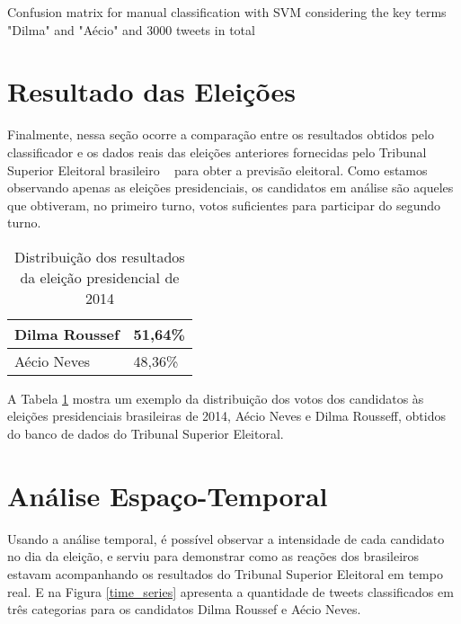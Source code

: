  Confusion matrix for manual classification with SVM considering the
 key terms "Dilma" and "Aécio" and 3000 tweets in total
 
 
 
 \section{Resultado das Eleições}
 
 Finalmente, nessa seção ocorre a comparação
 entre os resultados obtidos pelo classificador e os dados
 reais das eleições anteriores fornecidas pelo Tribunal Superior
 Eleitoral brasileiro ~\cite{TSE} para obter a previsão eleitoral. Como
 estamos observando apenas as eleições presidenciais, os candidatos
 em análise são aqueles que obtiveram, no primeiro
 turno, votos suficientes para participar do segundo turno.
 
 \begin{table}[tbp]
     \centering
     \caption{Distribuição dos resultados da eleição presidencial de 2014}
     \label{tb:eleicoes2014}
     \begin{tabular}{ll}
     \hline
     Dilma Roussef & 51,64\% \\ \hline
     Aécio Neves & 48,36\% \\ \hline
     \end{tabular}
 \end{table}
 
 A Tabela \ref{tb:eleicoes2014} mostra um exemplo da distribuição dos votos
 dos candidatos às eleições presidenciais brasileiras de 2014,
 Aécio Neves e Dilma Rousseff, obtidos do banco de dados do
 Tribunal Superior Eleitoral.
 
 
 
 
 \section{Análise Espaço-Temporal}
 
 
 Usando a análise temporal, é possível observar a intensidade
 de cada candidato no dia da eleição, e serviu para demonstrar
 como as reações dos brasileiros estavam acompanhando os
 resultados do Tribunal Superior Eleitoral em tempo real. E na
 Figura \ref{time_series} apresenta a quantidade de tweets classificados
 em três categorias para os candidatos Dilma Roussef e
 Aécio Neves.
 
